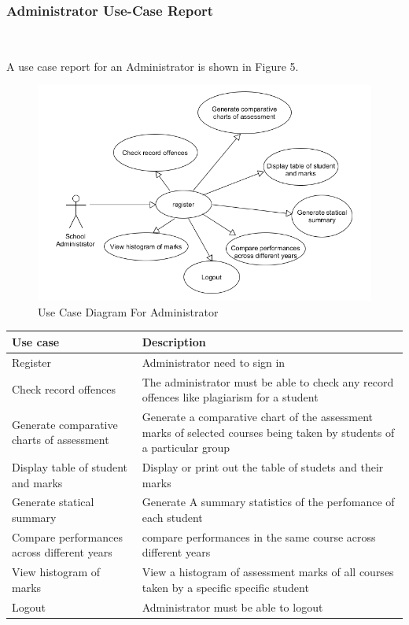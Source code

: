 \documentclass[10pt,onecolumn]{RequimentsGathering}
\begin{document}
	
	
	
	\clearpage
	\subsubsection{Administrator Use-Case Report}$\;\;\;\;\;\;\;\;\;\;\;\;\;\;\;\;\;\;\;\;\;\;\;$
	
	A use case report for an Administrator is shown in Figure 5.
	\begin{center}
		\begin{figure}[h]
			\centering
			\includegraphics[trim={0cm 0cm 0cm 0cm },clip,scale = 0.85]{AdminUsecase}
			\caption{Use Case Diagram For Administrator}
		\end{figure}
	\end{center}
	
	
	
	\begin{center}
		\begin{tabular}{ | p{3cm} | p{10cm}| }
			\hline
			\textbf{Use case}& \textbf{Description} \\ \hline
			Register & Administrator need to sign in \\ \hline
			Check record offences & The administrator must be able to check any record offences like plagiarism for a student   \\ \hline
			Generate comparative charts of assessment & Generate a comparative chart of the assessment marks of selected courses 
being taken by students of a particular group \\ \hline
Display table of student and marks & Display or print out the table
of studets and their marks\\ \hline
Generate statical summary & Generate A summary statistics of the perfomance of each student  \\ \hline
Compare performances across different years & compare performances in the same course across different years \\ \hline 
View histogram of marks & View a histogram of assessment marks
of all courses taken by a specific specific student  \\ \hline 

			Logout          & Administrator must be able to logout  \\ \hline
			
		\end{tabular}
	\end{center}
	
\end{document}
